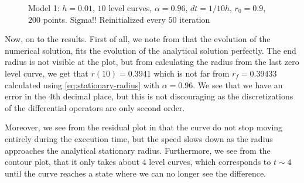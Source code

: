 \begin{figure}
\begin{center}
\end{center}
\vspace{-2.5em}
\caption[Model 1 - Circular example $\alpha=0.96$]{Model 1: $h=0.01$, $10$ level curves, $\alpha=0.96$, $dt=1/10h$, $r_0=0.9$, $200$ points. Sigma!! Reinitialized every $50$ iteration}
\label{fig:model1-sigma-dist-full}
\end{figure}

Now, on to the results. First of all, we note from  that the evolution of the numerical solution, fits the evolution of the analytical solution perfectly. The end radius is not visible at the plot, but from calculating the radius from the last zero level curve, we get that $r(10)=0.3941$ which is not far from $r_f=0.39433$ calculated using \eqref{eq:stationary-radius} with $\alpha=0.96$. We see that we have an error in the $4$th decimal place, but this is not discouraging as the discretizations of the differential operators are only second order.

Moreover, we see from the residual plot in  that the curve do not stop moving entirely during the execution time, but the speed slows down as the radius approaches the analytical stationary radius. Furthermore, we see from the contour plot, that it only takes about $4$ level curves, which corresponds to $t\sim 4$ until the curve reaches a state where we can no longer see the difference. 


